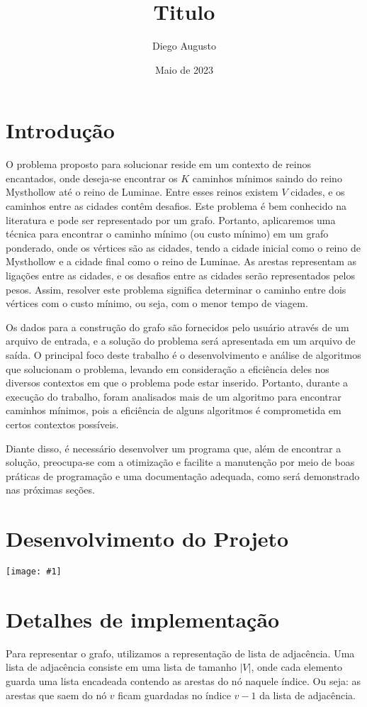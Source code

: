 \documentclass[12pt]{article}
\title{Titulo}
\date{Maio de 2023}
\author{Diego Augusto}
\newcommand \image[1]{\noindent
    \texttt{[image: \#1]}}
\begin{document}

    \maketitle
    \newpage
    \section{Introdução}
    O problema proposto para solucionar reside em um contexto de reinos
    encantados, onde deseja-se encontrar os $K$ caminhos mínimos saindo do reino Mysthollow até o reino de Luminae. Entre esses
    reinos existem $V$ cidades, e os caminhos entre as cidades contêm desafios. Este
    problema é bem conhecido na literatura e pode ser representado por um grafo.
    Portanto, aplicaremos uma técnica para encontrar o caminho mínimo (ou custo
    mínimo) em um grafo ponderado, onde os vértices são as cidades, tendo a
    cidade inicial como o reino de Mysthollow e a cidade final como o reino de
    Luminae. As arestas representam as ligações entre as cidades, e os desafios
    entre as cidades serão representados pelos pesos. Assim, resolver este
    problema significa determinar o caminho entre dois vértices com o custo
    mínimo, ou seja, com o menor tempo de viagem.

    Os dados para a construção do grafo são fornecidos pelo usuário através de um
    arquivo de entrada, e a solução do problema será apresentada em um arquivo de
    saída. O principal foco deste trabalho é o desenvolvimento e análise de
    algoritmos que solucionam o problema, levando em consideração a eficiência deles
    nos diversos contextos em que o problema pode estar inserido. Portanto, durante
    a execução do trabalho, foram analisados mais de um algoritmo para encontrar
    caminhos mínimos, pois a eficiência de alguns algoritmos é comprometida em
    certos contextos possíveis.

    Diante disso, é necessário desenvolver um programa que, além de encontrar a
    solução, preocupa-se com a otimização e facilite a manutenção por meio de boas
    práticas de programação e uma documentação adequada, como será demonstrado nas
    próximas seções.
    \section{Desenvolvimento do Projeto}

    \image{fluxo}

    \section{Detalhes de implementação}
    Para representar o grafo, utilizamos a representação de lista de adjacência.
    Uma lista de adjacência consiste em uma lista de tamanho $|V|$, onde cada
    elemento guarda uma lista encadeada contendo as arestas do nó naquele
    índice. Ou seja: as arestas que saem do nó $v$ ficam guardadas no índice
    $v-1$ da lista de adjacência.
\end{document}
